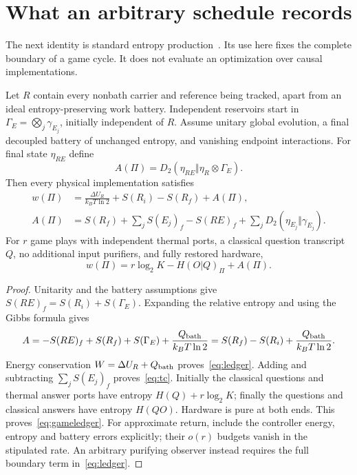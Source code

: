 \section{What an arbitrary schedule records}\label{sec:schedules}
The next identity is standard entropy production~\cite{esposito,reebwolf}. Its use here fixes the complete boundary of a game cycle. It does not evaluate an optimization over causal implementations.

\begin{proposition}\label{prop:ledger}
Let $R$ contain every nonbath carrier and reference being tracked, apart from an ideal entropy-preserving work battery. Independent reservoirs start in $\Gamma_E=\bigotimes_j\gamma_{E_j}$, initially independent of $R$. Assume unitary global evolution, a final decoupled battery of unchanged entropy, and vanishing endpoint interactions. For final state $\eta_{RE}$ define
\[
 A(\Pi)=D_2(\eta_{RE}\Vert\eta_R\otimes\Gamma_E).
\]
Then every physical implementation satisfies
\begin{align}
 w(\Pi)&=\frac{\Delta U_R}{k_BT\ln2}+S(R_i)-S(R_f)+A(\Pi),\label{eq:ledger}\\
 A(\Pi)&=S(R_f)+\sum_jS(E_j)_f-S(RE)_f
             +\sum_jD_2(\eta_{E_j}\Vert\gamma_{E_j}).\label{eq:tc}
\end{align}
For $r$ game plays with independent thermal ports, a classical question transcript $Q$, no additional input purifiers, and fully restored hardware,
\begin{equation}
 w(\Pi)=r\log_2K-H(O|Q)_\Pi+A(\Pi).\label{eq:gameledger}
\end{equation}
\end{proposition}
\begin{proof}
Unitarity and the battery assumptions give $S(RE)_f=S(R_i)+S(\Gamma_E)$. Expanding the relative entropy and using the Gibbs formula gives
\[
 A=-S(RE)_f+S(R_f)+S(\Gamma_E)+\frac{Q_{\rm bath}}{k_BT\ln2}
   =S(R_f)-S(R_i)+\frac{Q_{\rm bath}}{k_BT\ln2}.
\]
Energy conservation $W=\Delta U_R+Q_{\rm bath}$ proves~\eqref{eq:ledger}. Adding and subtracting $\sum_jS(E_j)_f$ proves~\eqref{eq:tc}. Initially the classical questions and thermal answer ports have entropy $H(Q)+r\log_2K$; finally the questions and classical answers have entropy $H(QO)$. Hardware is pure at both ends. This proves~\eqref{eq:gameledger}. For approximate return, include the controller energy, entropy and battery errors explicitly; their $o(r)$ budgets vanish in the stipulated rate. An arbitrary purifying observer instead requires the full boundary term in~\eqref{eq:ledger}.
\end{proof}

